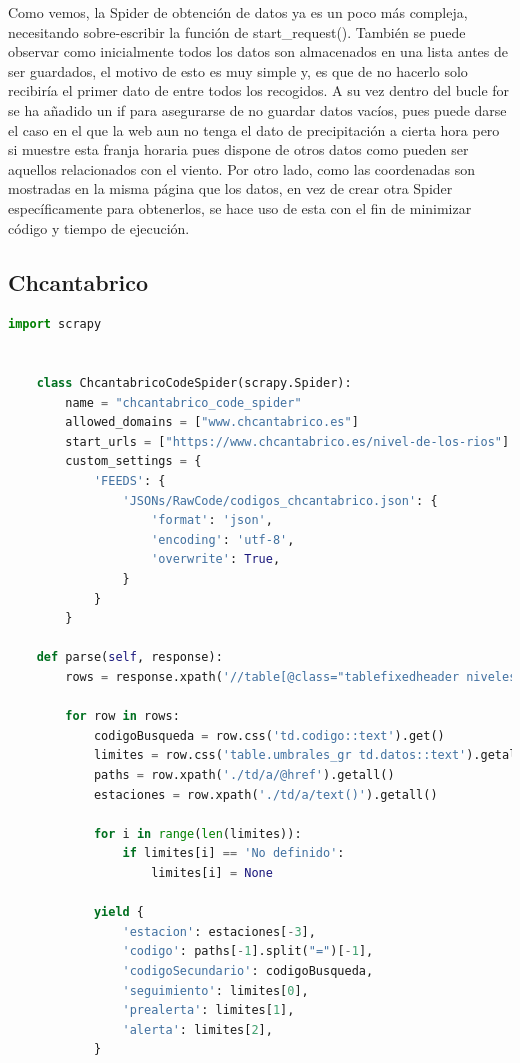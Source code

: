 Como vemos, la Spider de obtención de datos ya es un poco más compleja, necesitando sobre-escribir la función de start\_request(). También se puede observar como inicialmente todos los datos son almacenados en una lista antes de ser guardados, el motivo de esto es muy simple y, es que de no hacerlo solo recibiría el primer dato de entre todos los recogidos.\newline
A su vez dentro del bucle for se ha añadido un if para asegurarse de no guardar datos vacíos, pues puede darse el caso en el que la web aun no tenga el dato de precipitación a cierta hora pero si muestre esta franja horaria pues dispone de otros datos como pueden ser aquellos relacionados con el viento.\newline
Por otro lado, como las coordenadas son mostradas en la misma página que los datos, en vez de crear otra Spider específicamente para obtenerlos, se hace uso de esta con el fin de minimizar código y tiempo de ejecución.

\subsection{Chcantabrico}

\begin{lstlisting}[language=Python, caption={Code Spider}]
	import scrapy
	
	
	class ChcantabricoCodeSpider(scrapy.Spider):
		name = "chcantabrico_code_spider"
		allowed_domains = ["www.chcantabrico.es"]
		start_urls = ["https://www.chcantabrico.es/nivel-de-los-rios"]
		custom_settings = {
			'FEEDS': {
				'JSONs/RawCode/codigos_chcantabrico.json': {
					'format': 'json',
					'encoding': 'utf-8',
					'overwrite': True,
				}
			}
		}
	
	def parse(self, response):
		rows = response.xpath('//table[@class="tablefixedheader niveles"]/tbody/tr')
		
		for row in rows:
			codigoBusqueda = row.css('td.codigo::text').get()
			limites = row.css('table.umbrales_gr td.datos::text').getall()
			paths = row.xpath('./td/a/@href').getall()
			estaciones = row.xpath('./td/a/text()').getall()
		
			for i in range(len(limites)):
				if limites[i] == 'No definido':
					limites[i] = None
			
			yield {
				'estacion': estaciones[-3],
				'codigo': paths[-1].split("=")[-1],
				'codigoSecundario': codigoBusqueda,
				'seguimiento': limites[0],
				'prealerta': limites[1],
				'alerta': limites[2],
			}
\end{lstlisting}


